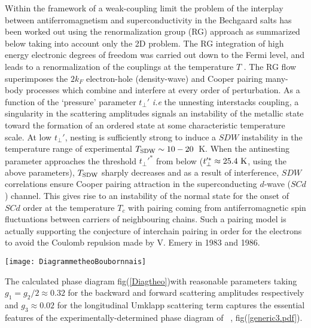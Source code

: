 \documentclass[11pt]{article} %
\begin{document}
Within the framework of a weak-coupling limit  the problem of the interplay between antiferromagnetism and superconductivity in the Bechgaard salts has been worked out using the renormalization group (RG) approach \cite{Bourbonnais09,Nickel05} as summarized below taking into account only the 2D problem.  
 The RG integration of high energy electronic degrees  of freedom was  carried out  down to the Fermi level, and leads to a  renormalization of the couplings at  the temperature $T$ \cite{Duprat01,Nickel06,Bourbonnais09}.  The RG flow   superimposes  the $2k_F$ electron-hole (density-wave) and Cooper pairing many-body processes which combine and interfere    at every  order of perturbation. As a function of the `pressure' parameter  $t_\perp'$ \textit{i.e} the unnesting  interstacks coupling, a   singularity  in the scattering amplitudes signals an instability of the metallic state  toward the formation of an ordered state at some characteristic temperature scale. At low $t_\perp'$, nesting is sufficiently strong to induce a $SDW$ instability in  the temperature range  of experimental  $T_{\rm SDW}\sim 10-20$~K. When the antinesting parameter approaches the threshold $t_\perp'^*$  from below  ($t_\perp'^* \approx 25.4~{\rm K}$, using the above  parameters), $T_{\rm SDW}$ sharply decreases and  as a result of interference, $SDW$ correlations ensure  Cooper pairing attraction in the superconducting $d$-wave ($SCd$) channel. This   gives rise to  an    instability  of the normal state   for the onset of  $SCd$ order at  the temperature $T_c$ with pairing   coming from antiferromagnetic spin fluctuations between carriers of neighbouring chains. Such a pairing model is actually supporting the conjecture of interchain pairing in order for the electrons to avoid the Coulomb repulsion made  by V. Emery in 1983 and 1986\cite{Emery83,Emery86}.
  \begin{figure*}[htbp]	\centerline{ \texttt{[image: DiagrammetheoBoubornnais]}}
\caption{Calculated phase diagram of the quasi-onedimensionalelectron gas model from the renormalization group method at the one-loop level\cite{Bourbonnais09}.
$\Theta$ and 
the dash-dotted line defines the temperature region of the CW behavior for the inverse
normalized SDW response function
}
\label{Diagtheo} 
\end{figure*}

 The calculated phase diagram fig(\ref{Diagtheo})with reasonable parameters taking   $g_1=g_2/2 \approx 0.32$ for  the backward and forward scattering amplitudes  respectively and $g_3\approx 0.02$ for the  longitudinal  Umklapp scattering  term captures the essential features of the experimentally-determined phase diagram of ~\cite{Bourbonnais09,Bourbonnais11}, fig(\ref{generic3.pdf}). 
\end{document}
